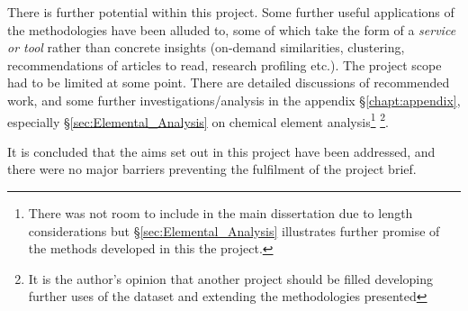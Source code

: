 \addtocounter{page}{-2}
\null
\newpage
\addtocounter{page}{1}
\null
\newpage
There is further potential within this project. Some further useful applications of the methodologies have been alluded to, some of which take the form of a \emph{service or tool} rather than concrete insights (on-demand similarities, clustering, recommendations of articles to read, research profiling etc.). The project scope had to be limited at some point. There are detailed discussions of recommended work, and some further investigations/analysis in the appendix \S\ref{chapt:appendix}, especially \S\ref{sec:Elemental_Analysis} on chemical element analysis\footnote{There was not room to include in the main dissertation due to length considerations but \S\ref{sec:Elemental_Analysis} illustrates further promise of the methods developed in this the project.} \footnote{It is the author's opinion that another project should be filled developing further uses of the dataset and extending the methodologies presented}.

It is concluded that the aims set out in this project have been addressed, and there were no major barriers preventing the fulfilment of the project brief. 